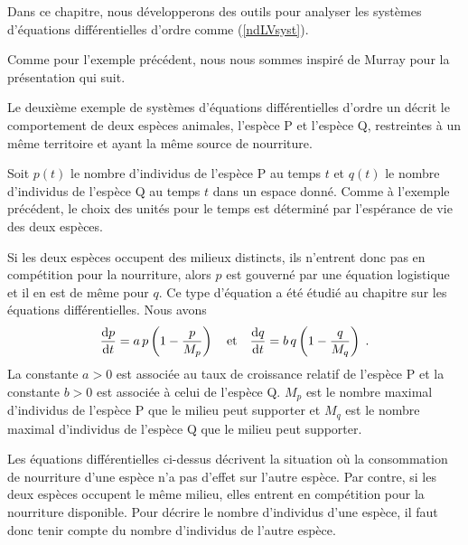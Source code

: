 {\begin{egg}
Dans ce chapitre, nous développerons des outils pour analyser les systèmes
d'équations différentielles d'ordre comme (\ref{ndLVsyst}).
\end{egg}

\begin{egg} \label{COMPEXCL}
Comme pour l'exemple précédent, nous nous sommes inspiré de Murray \cite{M}
pour la présentation qui suit.

Le deuxième exemple de systèmes d'équations différentielles d'ordre un
décrit le comportement de deux espèces animales, l'espèce P et
l'espèce Q, restreintes à un même territoire et ayant la même source
de nourriture.

Soit $p(t)$ le nombre d'individus de l'espèce P au temps $t$ et $q(t)$ le
nombre d'individus de l'espèce Q au temps $t$ dans un espace donné.
Comme à l'exemple précédent, le choix des unités pour le temps est
déterminé par l'espérance de vie des deux espèces.

Si les deux espèces occupent des milieux distincts, ils n'entrent donc pas en
compétition pour la nourriture, alors $p$ est gouverné par une équation
logistique et il en est de même pour $q$.  Ce type d'équation a été étudié
au chapitre sur les équations différentielles.  Nous avons
\begin{equation}\label{twoLEQ}
\frac{\mathrm{d}p}{\mathrm{d}t} = a\,p\left(1-\frac{p}{M_p}\right)
\quad \text{et} \quad
\frac{\mathrm{d}q}{\mathrm{d}t} = b\,q\left(1- \frac{q}{M_q}\right) \; .
\end{equation}
La constante $a>0$ est associée au taux de croissance relatif de l'espèce P et
la constante $b>0$ est associée à celui de l'espèce Q.  $M_p$ est le nombre
maximal d'individus de l'espèce P que le milieu peut supporter et $M_q$ est
le nombre maximal d'individus de l'espèce Q que le milieu peut supporter.

Les équations différentielles ci-dessus décrivent la situation où la
consommation de nourriture d'une espèce n'a pas d'effet sur l'autre espèce.
Par contre, si les deux espèces occupent le même milieu, elles entrent en
compétition pour la nourriture disponible.  Pour décrire le nombre
d'individus d'une espèce, il faut donc tenir compte du nombre d'individus de
l'autre espèce.


\end{egg}}
